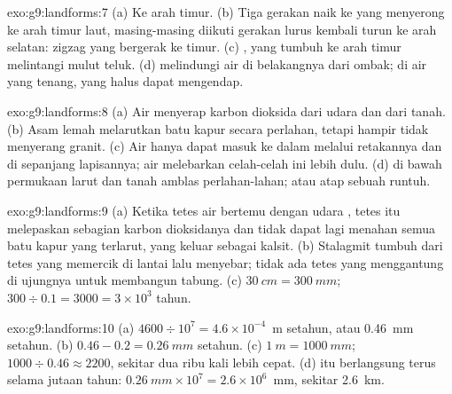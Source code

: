 \begin{solution}{exo:g9:landforms:7}
(a) Ke arah timur. (b) Tiga gerakan naik ke  yang menyerong ke arah
timur laut, masing-masing diikuti gerakan lurus kembali turun ke arah
selatan: zigzag yang bergerak ke timur. (c) , yang tumbuh ke
arah timur melintangi mulut teluk. (d)  melindungi air di
belakangnya dari ombak; di air yang tenang,  yang halus dapat
mengendap.
\end{solution}

\begin{solution}{exo:g9:landforms:8}
(a) Air  menyerap karbon dioksida dari udara dan dari tanah. (b) Asam
lemah melarutkan batu kapur secara perlahan, tetapi hampir tidak
menyerang granit. (c) Air hanya dapat masuk ke dalam  melalui
retakannya dan di sepanjang lapisannya; air melebarkan celah-celah ini
lebih dulu. (d)  di bawah permukaan larut dan tanah amblas
perlahan-lahan; atau atap sebuah  runtuh.
\end{solution}

\begin{solution}{exo:g9:landforms:9}
(a) Ketika tetes air bertemu dengan udara , tetes itu melepaskan
sebagian karbon dioksidanya dan tidak dapat lagi menahan semua batu kapur
yang terlarut, yang keluar sebagai kalsit. (b) Stalagmit tumbuh dari tetes
yang memercik di lantai lalu menyebar; tidak ada tetes yang menggantung di
ujungnya untuk membangun tabung. (c) $\qty{30}{cm} = \qty{300}{mm}$;
$300 \div 0.1 = 3000 = 3 \times 10^3$ tahun.
\end{solution}

\begin{solution}{exo:g9:landforms:10}
(a) $4600 \div 10^7 = 4.6 \times 10^{-4}$~m setahun, atau \qty{0.46}{mm}
setahun. (b) $0.46 - 0.2 = \qty{0.26}{mm}$ setahun. (c) $\qty{1}{m} =
\qty{1000}{mm}$; $1000 \div 0.46 \approx 2200$, sekitar dua ribu kali
lebih cepat. (d)  itu berlangsung terus selama jutaan tahun:
$\qty{0.26}{mm} \times
10^7 = 2.6 \times 10^6$~mm, sekitar \qty{2.6}{km}.
\end{solution}

